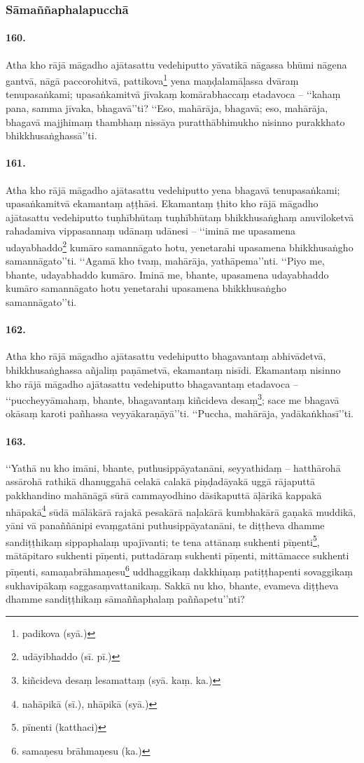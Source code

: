 \subsubsection{Sāmaññaphalapucchā}

\paragraph{160.} Atha kho rājā māgadho ajātasattu vedehiputto yāvatikā nāgassa bhūmi nāgena gantvā, nāgā paccorohitvā, pattikova\footnote{padikova (syā.)} yena maṇḍalamāḷassa dvāraṃ tenupasaṅkami; upasaṅkamitvā jīvakaṃ komārabhaccaṃ etadavoca – ‘‘kahaṃ pana, samma jīvaka, bhagavā’’ti? ‘‘Eso, mahārāja, bhagavā; eso, mahārāja, bhagavā majjhimaṃ thambhaṃ nissāya puratthābhimukho nisinno purakkhato bhikkhusaṅghassā’’ti.

\paragraph{161.} Atha kho rājā māgadho ajātasattu vedehiputto yena bhagavā tenupasaṅkami; upasaṅkamitvā ekamantaṃ aṭṭhāsi. Ekamantaṃ ṭhito kho rājā māgadho ajātasattu vedehiputto tuṇhībhūtaṃ tuṇhībhūtaṃ bhikkhusaṅghaṃ anuviloketvā rahadamiva vippasannaṃ udānaṃ udānesi – ‘‘iminā me upasamena udayabhaddo\footnote{udāyibhaddo (sī. pī.)} kumāro samannāgato hotu, yenetarahi upasamena bhikkhusaṅgho samannāgato’’ti. ‘‘Agamā kho tvaṃ, mahārāja, yathāpema’’nti. ‘‘Piyo me, bhante, udayabhaddo kumāro. Iminā me, bhante, upasamena udayabhaddo kumāro samannāgato hotu yenetarahi upasamena bhikkhusaṅgho samannāgato’’ti.

\paragraph{162.} Atha kho rājā māgadho ajātasattu vedehiputto bhagavantaṃ abhivādetvā, bhikkhusaṅghassa añjaliṃ paṇāmetvā, ekamantaṃ nisīdi. Ekamantaṃ nisinno kho rājā māgadho ajātasattu vedehiputto bhagavantaṃ etadavoca – ‘‘puccheyyāmahaṃ, bhante, bhagavantaṃ kiñcideva desaṃ\footnote{kiñcideva desaṃ lesamattaṃ (syā. kaṃ. ka.)}; sace me bhagavā okāsaṃ karoti pañhassa veyyākaraṇāyā’’ti. ‘‘Puccha, mahārāja, yadākaṅkhasī’’ti.

\paragraph{163.} ‘‘Yathā nu kho imāni, bhante, puthusippāyatanāni, seyyathidaṃ – hatthārohā assārohā rathikā dhanuggahā celakā calakā piṇḍadāyakā uggā rājaputtā pakkhandino mahānāgā sūrā cammayodhino dāsikaputtā āḷārikā kappakā nhāpakā\footnote{nahāpikā (sī.), nhāpikā (syā.)} sūdā mālākārā rajakā pesakārā naḷakārā kumbhakārā gaṇakā muddikā, yāni vā panaññānipi evaṃgatāni puthusippāyatanāni, te diṭṭheva dhamme sandiṭṭhikaṃ sippaphalaṃ upajīvanti; te tena attānaṃ sukhenti pīṇenti\footnote{pīnenti (katthaci)}, mātāpitaro sukhenti pīṇenti, puttadāraṃ sukhenti pīṇenti, mittāmacce sukhenti pīṇenti, samaṇabrāhmaṇesu\footnote{samaṇesu brāhmaṇesu (ka.)} uddhaggikaṃ dakkhiṇaṃ patiṭṭhapenti sovaggikaṃ sukhavipākaṃ saggasaṃvattanikaṃ. Sakkā nu kho, bhante, evameva diṭṭheva dhamme sandiṭṭhikaṃ sāmaññaphalaṃ paññapetu’’nti?

